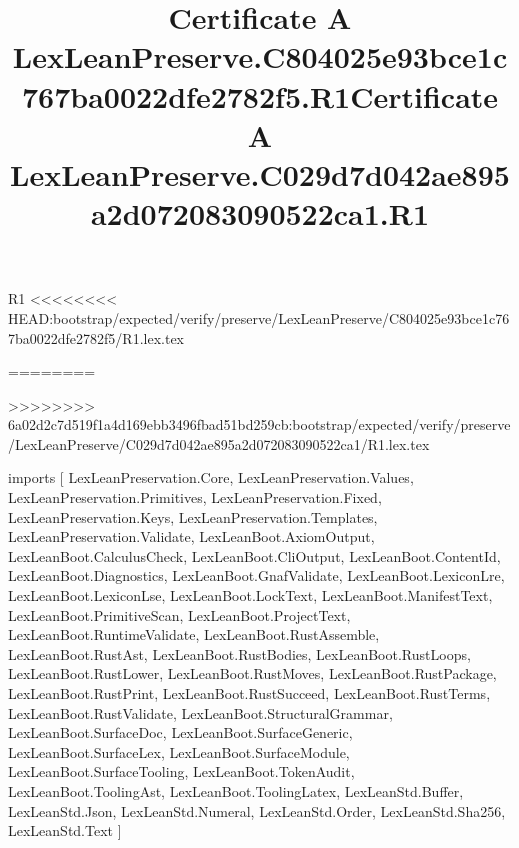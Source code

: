 \begin{lexlean}{R1}
<<<<<<<< HEAD:bootstrap/expected/verify/preserve/LexLeanPreserve/C804025e93bce1c767ba0022dfe2782f5/R1.lex.tex
\title{Certificate A LexLeanPreserve.C804025e93bce1c767ba0022dfe2782f5.R1}
========
\title{Certificate A LexLeanPreserve.C029d7d042ae895a2d072083090522ca1.R1}
>>>>>>>> 6a02d2c7d519f1a4d169ebb3496fbad51bd259cb:bootstrap/expected/verify/preserve/LexLeanPreserve/C029d7d042ae895a2d072083090522ca1/R1.lex.tex
\begin{coremodule}
imports [
  LexLeanPreservation.Core,
  LexLeanPreservation.Values,
  LexLeanPreservation.Primitives,
  LexLeanPreservation.Fixed,
  LexLeanPreservation.Keys,
  LexLeanPreservation.Templates,
  LexLeanPreservation.Validate,
  LexLeanBoot.AxiomOutput,
  LexLeanBoot.CalculusCheck,
  LexLeanBoot.CliOutput,
  LexLeanBoot.ContentId,
  LexLeanBoot.Diagnostics,
  LexLeanBoot.GnafValidate,
  LexLeanBoot.LexiconLre,
  LexLeanBoot.LexiconLse,
  LexLeanBoot.LockText,
  LexLeanBoot.ManifestText,
  LexLeanBoot.PrimitiveScan,
  LexLeanBoot.ProjectText,
  LexLeanBoot.RuntimeValidate,
  LexLeanBoot.RustAssemble,
  LexLeanBoot.RustAst,
  LexLeanBoot.RustBodies,
  LexLeanBoot.RustLoops,
  LexLeanBoot.RustLower,
  LexLeanBoot.RustMoves,
  LexLeanBoot.RustPackage,
  LexLeanBoot.RustPrint,
  LexLeanBoot.RustSucceed,
  LexLeanBoot.RustTerms,
  LexLeanBoot.RustValidate,
  LexLeanBoot.StructuralGrammar,
  LexLeanBoot.SurfaceDoc,
  LexLeanBoot.SurfaceGeneric,
  LexLeanBoot.SurfaceLex,
  LexLeanBoot.SurfaceModule,
  LexLeanBoot.SurfaceTooling,
  LexLeanBoot.TokenAudit,
  LexLeanBoot.ToolingAst,
  LexLeanBoot.ToolingLatex,
  LexLeanStd.Buffer,
  LexLeanStd.Json,
  LexLeanStd.Numeral,
  LexLeanStd.Order,
  LexLeanStd.Sha256,
  LexLeanStd.Text
]


\end{coremodule}
\end{lexlean}
